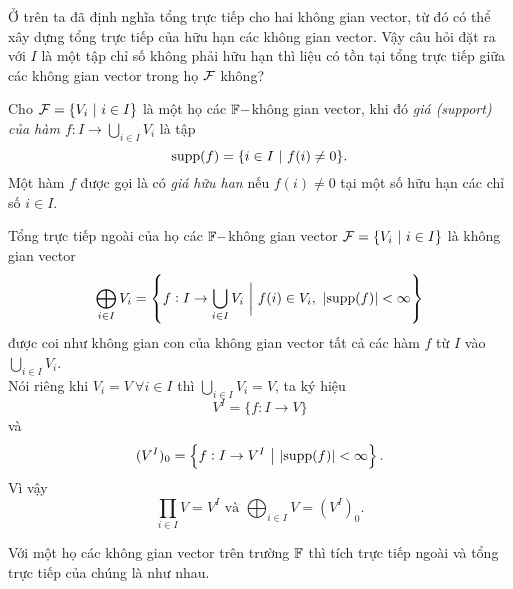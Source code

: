 \begin{question*}
    Ở trên ta đã định nghĩa tổng trực tiếp cho hai không gian vector, từ đó có thể xây dựng tổng trực tiếp của hữu hạn các không gian vector. Vậy câu hỏi đặt ra với $I$ là một tập chỉ số không phải hữu hạn thì liệu có tồn tại tổng trực tiếp giữa các không gian vector trong họ $\mathcal{F}$ không?
\end{question*}
\begin{defn}
    Cho $\mathcal{F} = \{V_i~|~i \in I\}$ là một họ các $\mathbb{F}-$không gian vector, khi đó \textit{giá (support) của hàm $f: I \to \bigcup_{i\in I }{V_i}$} là tập 
    \[\text{supp}(f) = \{i \in I~|~f(i) \neq 0\}.\]
    Một hàm $f$ được gọi là có \textit{giá hữu han} nếu $f(i) \neq 0$ tại một số hữu hạn các chỉ số $i \in I$. 
\end{defn}
\begin{defn}
    Tổng trực tiếp ngoài của họ các $\mathbb{F}-$không gian vector $\mathcal{F} = \{V_i~|~i \in I\}$ là không gian vector 
    \[\bigoplus_{i\in I}{V_i} = \left\{f: I \to \bigcup_{i\in I } V_i~\bigg|~f(i) \in V_i,~|\text{supp}(f)| < \infty\right\}\]
    được coi như không gian con của không gian vector tất cả các hàm $f$ từ $I$ vào $\bigcup_{i\in I } V_i$.\\
    Nói riêng khi $V_i = V~\forall i \in I$ thì $\bigcup_{i\in I } V_i = V$, ta ký hiệu 
    \[V^I = \{f: I \to V\}\] và 
    \[(V^I)_0 = \left\{f: I \to V^I~\big|~|\text{supp}(f)| < \infty\right\}.\]
    Vì vậy
    \[\prod_{i \in I}{V} = V^I \text{ và } \bigoplus_{i\in I}{V} = (V^I)_0.\]
\end{defn}
\begin{comment*}
    Với một họ các không gian vector trên trường $\F$ thì tích trực tiếp ngoài và tổng trực tiếp của chúng là như nhau.
\end{comment*}
